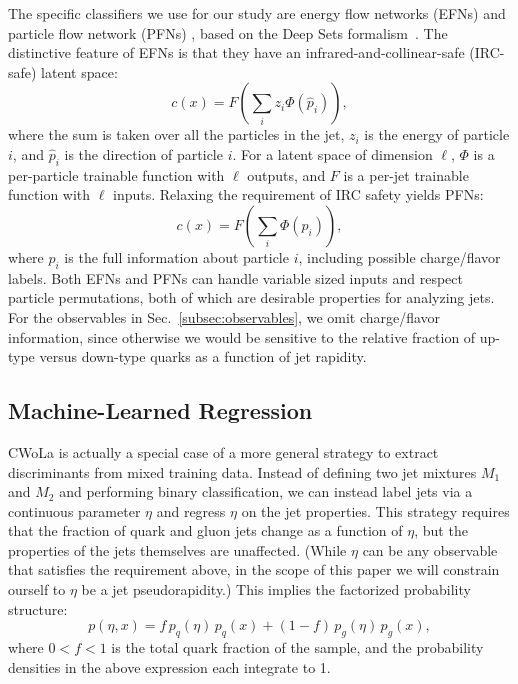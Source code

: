 \documentclass[aps,prd,twocolumn,preprintnumbers,nofootinbib,longbibliography,floatfix]{revtex4-1}
\DeclareRobustCommand{\Sec}[1]{Sec.~\ref{#1}}
\newcommand{\cor}[1]{#1}
\begin{document}
The specific classifiers we use for our study are energy flow networks (EFNs) and particle flow network (PFNs) \cite{Komiske:2018cqr}, based on the Deep Sets formalism~\cite{zaheer2017deep}.
%
The distinctive feature of EFNs is that they have an infrared-and-collinear-safe (IRC-safe) latent space:
%
\begin{equation}
	c(x) = F \left( \sum_{i} z_i \Phi(\hat{p}_i) \right),
\end{equation}
%
where the sum is taken over all the particles in the jet, $z_i$ is the energy of particle $i$, and $\hat{p}_i$ is the direction of particle $i$.
%
For a latent space of dimension $\ell$, $\Phi$ is a per-particle trainable function with $\ell$ outputs, and $F$ is a per-jet trainable function with $\ell$ inputs.
%
Relaxing the requirement of IRC safety yields PFNs:
%
\begin{equation}
	\label{eq:PFN_def}
	c(x) = F \left( \sum_{i} \Phi(p_i) \right),
\end{equation}
%
where $p_i$ is the full information about particle $i$, including possible charge/flavor labels.
%
Both EFNs and PFNs can handle variable sized inputs and respect particle permutations, both of which are desirable properties for analyzing jets.
%
For the observables in \Sec{subsec:observables}, we omit charge/flavor information, since otherwise we would be sensitive to the relative fraction of up-type versus down-type quarks as a function of jet rapidity.





\subsection{Machine-Learned Regression}
\label{subsection:regressions}


CWoLa is actually a special case of a more general strategy to extract discriminants from mixed training data.
%
Instead of defining two jet mixtures $M_1$ and $M_2$ and performing binary classification, we can instead label jets via a continuous parameter $\eta$ and regress $\eta$ on the jet properties.
%
This strategy requires that the fraction of quark and gluon jets change as a function of $\eta$, but the properties of the jets themselves are unaffected.
%
\cor{(While $\eta$ can be any observable that satisfies the requirement above, in the scope of this paper we will constrain ourself to $\eta$ be a jet pseudorapidity.)}
%
This implies the factorized probability structure:
%
\begin{equation}
\label{eq:factorized_eta}
p(\eta, x) = f \, p_q(\eta) \, p_q(x) + (1-f) \, p_g(\eta) \, p_g(x),
\end{equation}
%
where $0< f < 1$ is the total quark fraction of the sample, and the probability densities in the above expression each integrate to 1.
\end{document}
